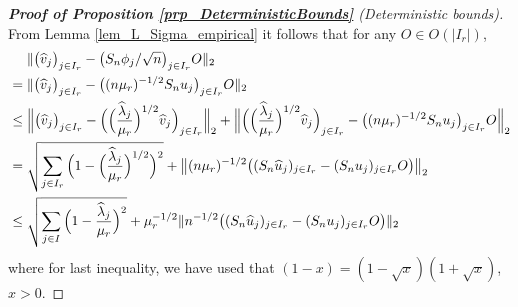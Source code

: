 \documentclass[a4paper,11pt]{article} %
\numberwithin{equation}{section}
\theoremstyle{definition}
\theoremstyle{remark}
\theoremstyle{plain}
\begin{document}
\begin{proof}[\normalfont \textbf{Proof of Proposition \ref{prp_DeterministicBounds}} (Deterministic bounds)]%
  \label{prf_DeterminisicBounds}
  From Lemma \ref{lem_L_Sigma_empirical} it follows that for any \( O \in O(|I_{r}|) \), 
  \begin{align} \label{eq_EigenfunctionComparison_1}
    & \ \ \ \
          \|  \big( \widehat{v}_{j}           \big)_{j \in I_{r}} 
            - \big( S_{n} \phi_{j} / \sqrt{n} \big)_{j \in I_{r}} O 
          \|_{2}
          \\
    &  =
          \| \big( \widehat{v}_{j}              \big)_{j \in I_{r}}
           - \big( (n \mu_r)^{-1/2} S_{n} u_{j} \big)_{j \in I_{r}} O
          \|_{2}
    \notag\\
   & \le
          \Big\|   \big( \widehat{v}_{j} \big)_{j \in I_{r}} 
                 - \Big( \Big( \frac{\widehat{\lambda}_j}{\mu_r} \Big)^{1/2} \widehat{v}_{j} 
                   \Big)_{j \in I_{r}} 
          \Big\|_{2}
        +
          \Big\|   \Big( \Big( \frac{\widehat{\lambda}_j}{\mu_r}\Big)^{1/2}\widehat{v}_{j} 
                   \Big)_{j \in I_{r}}  
                -  \big( (n\mu_r)^{-1/2}S_{n} u_{j} \big)_{j \in I_{r}} O
          \Big\|_{2}
    \notag
    \\
    & = 
          \sqrt{\sum_{j \in I_r} \Big( 1 - \Big(\frac{\widehat{\lambda}_j}{\mu_r} \Big)^{1/2} \Big)^2}
        +
          \big\| (n \mu_r)^{-1/2} 
                 \big( (S_{n} \widehat{u}_j)_{j \in I_{r}} - (S_{n} u_{j})_{j \in I_{r}} O \big) 
          \big\|_{2}
    \notag
    \\
    & \le 
           \sqrt{\sum_{j \in I_{}} \Big(1- \frac{\widehat{\lambda}_{j}}{\mu_{r}}  \Big)^{2} }
          + 
          \mu_{r}^{-1/2}
          \| n^{-1/2} \big( (S_{n} \widehat{u}_j)_{j \in I_{r}} - (S_{n} u_{j})_{j \in I_{r}} O \big) \|_{2}
    \notag
  \end{align}
  where for last inequality, we have used that \( (1 - x) = (1 - \sqrt{x}) (1 + \sqrt{x}) \), \( x > 0 \).


\end{proof}
\end{document}
